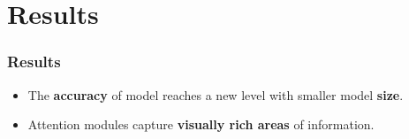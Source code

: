\documentclass{beamer}
\begin{document}
\section{Results}
\begin{frame}
\frametitle{Results}

\begin{figure}
\centering
{}
\end{figure}

\begin{itemize}
	\item The \textbf{accuracy} of model reaches a new level with smaller model \textbf{size}.
	\item Attention modules capture \textbf{visually rich areas} of information.
\end{itemize}

\end{frame}
\end{document}
